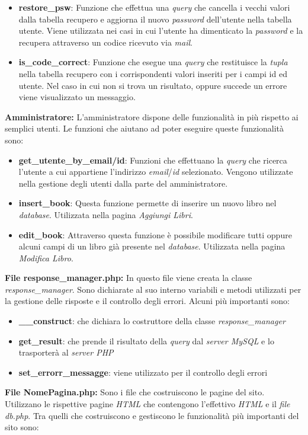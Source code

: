 \begin{itemize}
	\item \textbf{restore\_psw}: Funzione che effettua una \textit{query} che cancella i vecchi valori dalla tabella recupero e aggiorna il nuovo \textit{password} dell'utente nella tabella utente. Viene utilizzata nei casi in cui l’utente ha dimenticato la \textit{password} e la recupera attraverso un codice ricevuto via \textit{mail}.
	\item \textbf{is\_code\_correct}: Funzione che esegue una \textit{query} che restituisce la \textit{tupla} nella tabella recupero con i corrispondenti valori inseriti per i campi id ed utente. Nel caso in cui non si trova un risultato, oppure succede un errore viene visualizzato un messaggio.
\end{itemize}

\textbf{Amministratore:} L’amministratore dispone delle funzionalità in più rispetto ai semplici utenti. Le funzioni che aiutano ad poter eseguire queste funzionalità sono:
\begin{itemize}
	\item \textbf{get\_utente\_by\_email/id}: Funzioni che effettuano la \textit{query} che ricerca l’utente a cui appartiene l’indirizzo \textit{email}/\textit{id} selezionato. Vengono utilizzate nella gestione degli utenti dalla parte del amministratore.
	\item \textbf{insert\_book}: Questa funzione permette di inserire un nuovo libro nel \textit{database}. Utilizzata nella pagina \textit{Aggiungi Libri}.
	\item \textbf{edit\_book}: Attraverso questa funzione è possibile modificare tutti oppure alcuni campi di un libro già presente nel \textit{database}. Utilizzata nella pagina \textit{Modifica Libro}.
\end{itemize}

\textbf{File response\_manager.php:} In questo file viene creata la classe \textit{response\_manager}. Sono dichiarate al suo interno variabili e metodi utilizzati per la gestione delle risposte e il controllo degli errori. Alcuni più importanti sono:
\begin{itemize}
	\item \textbf{\_\_construct}: che dichiara lo costruttore della classe \textit{response\_manager}
	\item \textbf{get\_result}: che prende il risultato della \textit{query} dal \textit{server MySQL }e lo trasporterà al \textit{server PHP}
	\item \textbf{set\_errorr\_messagge}: viene utilizzato per il controllo degli errori
\end{itemize}

\textbf{File NomePagina.php:} Sono i file che costruiscono le pagine del sito. Utilizzano le rispettive pagine \textit{HTML} che contengono l’effettivo \textit{HTML} e il \textit{file db.php}. Tra quelli che costruiscono e gestiscono le funzionalità più importanti del sito sono:
